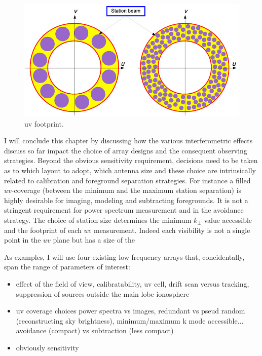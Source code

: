{\begin{figure}[]
\begin{center}
\includegraphics[width=1.\textwidth]{Bernardi/uv_footprint}
\end{center}
\caption{uv footprint.}
\label{fig:fig4}
\end{figure}
I will conclude this chapter by discussing how the various interferometric effects discuss so far impact the choice of array designs and the consequent observing strategies. Beyond the obvious sensitivity requirement, decisions need to be taken as to which layout to adopt, which antenna size and these choice are intrinsically related to calibration and foreground separation strategies. For instance a filled $uv$-coverage (between the minimum and the maximum station separation) is highly desirable for imaging, modeling and subtracting foregrounds. It is not a stringent requirement for power spectrum measurement and in the avoidance strategy. The choice of station size determines the minimum $k_\perp$ value accessible and the footprint of each $uv$ measurement. Indeed each visibility is not a single point in the $uv$ plane but has a size of the 

As examples, I will use four existing low frequency arrays that, concidentally, span the range of parameters of interest:

\begin{itemize}
\item effect of the field of view, calibratability, uv cell, drift scan versus tracking, suppression of sources outside the main lobe ionosphere
\item uv coverage choices power spectra vs images, redundant vs pseud random (reconstructing sky brightness), minimum/maximum k mode accessible... avoidance (compact) vs subtraction (less compact)
\item obviously sensitivity


\end{itemize}}
